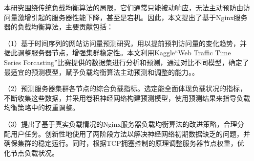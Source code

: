 \begin{cabstract}

	本研究围绕传统负载均衡算法的局限，它们通常只能被动响应，无法主动预防由访问量激增引起的服务器性能下降，甚至是宕机。因此，本文提出了基于Nginx服务器的负载均衡算法，主要贡献包括：

	（1）基于时间序列的网站访问量预测研究，用以提前预判访问量的变化趋势，并据此调整服务器节点，增强集群稳定性。本文利用Kaggle“Web Traffic Time Series Forcasting”比赛提供的数据集进行分析和预测，通过对比不同模型，确定了最适宜的预测模型，赋予负载均衡算法主动预测和调整的能力。。

	（2）预测服务器集群各节点的综合负载指标。选定能全面体现负载状况的指标，不断收集这些数据，并采用卷积神经网络构建预测模型，使用预测结果来指导负载均衡策略中的权重调整。

	（3）提出了基于真实负载情况的Nginx服务器负载均衡算法的改进策略，合理分配用户任务。创新性地使用了两阶段方法以解决神经网络初期数据缺乏的问题，并确保集群的稳定运行。同时，根据TCP拥塞控制的原理调整服务器节点权重，优化节点负载状况。

\end{cabstract}


